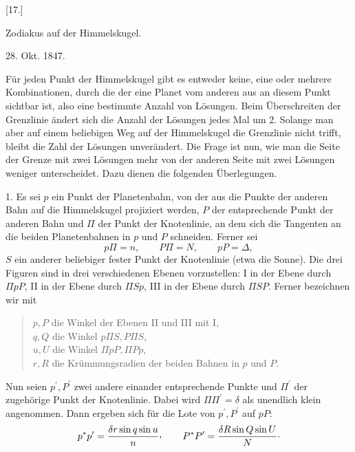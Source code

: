 \hypertarget{native-322-zusatz17}{}
\begin{center}
[17.]

Zodiakus auf der Himmelskugel.

28. Okt. 1847.
\end{center}

Für jeden Punkt der Himmelskugel gibt es entweder keine, eine oder mehrere Kombinationen, durch die der eine Planet vom anderen aus an diesem Punkt sichtbar ist, also eine bestimmte Anzahl von Lösungen. Beim Überschreiten der Grenzlinie ändert sich die Anzahl der Lösungen jedes Mal um 2. Solange man aber auf einem beliebigen Weg auf der Himmelskugel die Grenzlinie nicht trifft, bleibt die Zahl der Lösungen unverändert. Die Frage ist nun, wie man die Seite der Grenze mit zwei Lösungen mehr von der anderen Seite mit zwei Lösungen weniger unterscheidet. Dazu dienen die folgenden Überlegungen.

1. Es sei \(p\) ein Punkt der Planetenbahn, von der aus die Punkte der anderen Bahn auf die Himmelskugel projiziert werden, \(P\) der entsprechende Punkt der anderen Bahn und \(\Pi\) der Punkt der Knotenlinie, an dem sich die Tangenten an die beiden Planetenbahnen in \(p\) und \(P\) schneiden. Ferner sei
\[
p\Pi=n,\qquad P\Pi=N,\qquad pP=\Delta,
\]
\(S\) ein anderer beliebiger fester Punkt der Knotenlinie (etwa die Sonne). Die drei Figuren sind in drei verschiedenen Ebenen vorzustellen: I in der Ebene durch \(\Pi pP\), II in der Ebene durch \(\Pi Sp\), III in der Ebene durch \(\Pi SP\). Ferner bezeichnen wir mit
\begin{quote}
\noindent \(p,P\) die Winkel der Ebenen II und III mit I,\\
\(q,Q\) die Winkel \(p\Pi S,P\Pi S\),\\
\(u,U\) die Winkel \(\Pi pP,\Pi Pp\),\\
\(r,R\) die Krümmungsradien der beiden Bahnen in \(p\) und \(P\).
\end{quote}

Nun seien \(p^{\prime},P^{\prime}\) zwei andere einander entsprechende Punkte und \(\Pi^{\prime}\) der zugehörige Punkt der Knotenlinie. Dabei wird \(\Pi\Pi^{\prime}=\delta\) als unendlich klein angenommen. Dann ergeben sich für die Lote von \(p^{\prime},P^{\prime}\) auf \(pP\):
\[
p^{*}p^{\prime}=\frac{\delta r\sin q\sin u}{n}\mathpunct{\raisebox{.45ex}{\normalfont,}}\qquad
P^{*}P^{\prime}=\frac{\delta R\sin Q\sin U}{N}\mathpunct{\cdot}
\]

